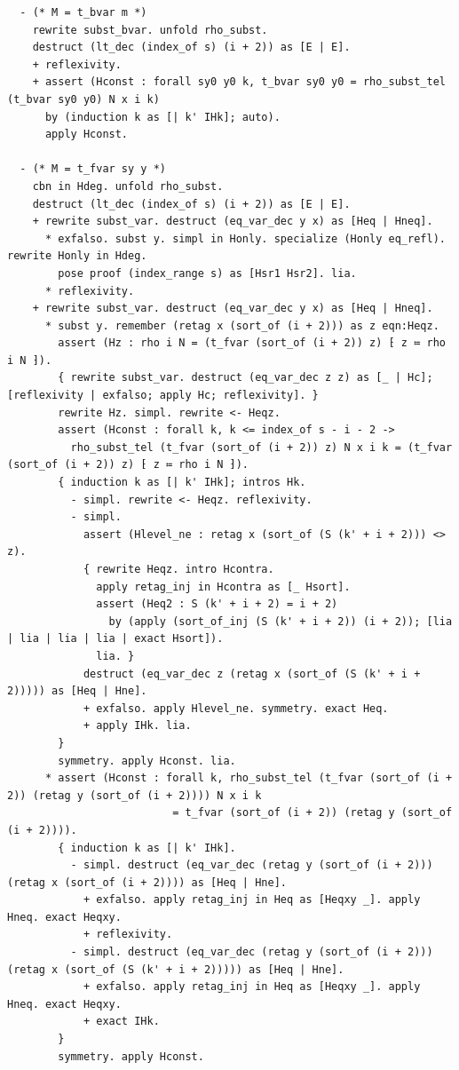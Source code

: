 \begin{latin}
\begin{verbatim}
  - (* M = t_bvar m *)
    rewrite subst_bvar. unfold rho_subst.
    destruct (lt_dec (index_of s) (i + 2)) as [E | E].
    + reflexivity.
    + assert (Hconst : forall sy0 y0 k, t_bvar sy0 y0 = rho_subst_tel (t_bvar sy0 y0) N x i k)
      by (induction k as [| k' IHk]; auto).
      apply Hconst.

  - (* M = t_fvar sy y *)
    cbn in Hdeg. unfold rho_subst.
    destruct (lt_dec (index_of s) (i + 2)) as [E | E].
    + rewrite subst_var. destruct (eq_var_dec y x) as [Heq | Hneq].
      * exfalso. subst y. simpl in Honly. specialize (Honly eq_refl). rewrite Honly in Hdeg.
        pose proof (index_range s) as [Hsr1 Hsr2]. lia.
      * reflexivity.
    + rewrite subst_var. destruct (eq_var_dec y x) as [Heq | Hneq].
      * subst y. remember (retag x (sort_of (i + 2))) as z eqn:Heqz.
        assert (Hz : rho i N = (t_fvar (sort_of (i + 2)) z) ⁅ z ≔ rho i N ⁆).
        { rewrite subst_var. destruct (eq_var_dec z z) as [_ | Hc]; [reflexivity | exfalso; apply Hc; reflexivity]. }
        rewrite Hz. simpl. rewrite <- Heqz.
        assert (Hconst : forall k, k <= index_of s - i - 2 ->
          rho_subst_tel (t_fvar (sort_of (i + 2)) z) N x i k = (t_fvar (sort_of (i + 2)) z) ⁅ z ≔ rho i N ⁆).
        { induction k as [| k' IHk]; intros Hk.
          - simpl. rewrite <- Heqz. reflexivity.
          - simpl.
            assert (Hlevel_ne : retag x (sort_of (S (k' + i + 2))) <> z).
            { rewrite Heqz. intro Hcontra.
              apply retag_inj in Hcontra as [_ Hsort].
              assert (Heq2 : S (k' + i + 2) = i + 2)
                by (apply (sort_of_inj (S (k' + i + 2)) (i + 2)); [lia | lia | lia | lia | exact Hsort]).
              lia. }
            destruct (eq_var_dec z (retag x (sort_of (S (k' + i + 2))))) as [Heq | Hne].
            + exfalso. apply Hlevel_ne. symmetry. exact Heq.
            + apply IHk. lia.
        }
        symmetry. apply Hconst. lia.
      * assert (Hconst : forall k, rho_subst_tel (t_fvar (sort_of (i + 2)) (retag y (sort_of (i + 2)))) N x i k
                          = t_fvar (sort_of (i + 2)) (retag y (sort_of (i + 2)))).
        { induction k as [| k' IHk].
          - simpl. destruct (eq_var_dec (retag y (sort_of (i + 2))) (retag x (sort_of (i + 2)))) as [Heq | Hne].
            + exfalso. apply retag_inj in Heq as [Heqxy _]. apply Hneq. exact Heqxy.
            + reflexivity.
          - simpl. destruct (eq_var_dec (retag y (sort_of (i + 2))) (retag x (sort_of (S (k' + i + 2))))) as [Heq | Hne].
            + exfalso. apply retag_inj in Heq as [Heqxy _]. apply Hneq. exact Heqxy.
            + exact IHk.
        }
        symmetry. apply Hconst.


\end{verbatim}
\end{latin}
